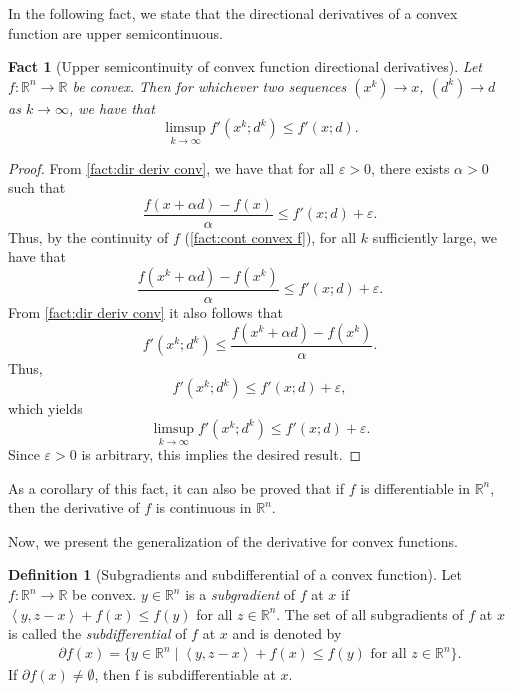 \documentclass[smallextended,numbook,nospthms]{svjour3}
\theoremstyle{plain}
\newtheorem{fact}[theorem]{Fact}
\theoremstyle{definition}
\newtheorem{definition}[theorem]{Definition}
\def\RR{\mathds R}
\newcommand{\scal}[2]{\left\langle{#1},{#2}  \right\rangle}
\begin{document}
In the following fact, we state that the directional derivatives of a convex function are upper semicontinuous.
\begin{fact}[Upper semicontinuity of convex function directional derivatives]\label{fact:dir deriv upper semicont}
Let $f: \RR^n \rightarrow \RR$ be convex. Then for whichever two sequences $(x^k) \rightarrow x$,	$(d^k) \rightarrow d$ as $k \rightarrow \infty$, we have that
\[
\limsup_{k \rightarrow \infty} f'(x^k;d^k) \leq f'(x;d).
\]
\end{fact}
\begin{proof}
	From \cref{fact:dir deriv conv}, we have that for all $\varepsilon>0$, there exists $\alpha>0$ such that
	\[
	\frac{f(x+\alpha d)-f(x)}{\alpha} \leq f'(x;d) + \varepsilon.
	\]
	Thus, by the continuity of $f$ (\cref{fact:cont convex f}), for all $k$ sufficiently large, we have that
	\[
	\frac{f(x^k+\alpha d)-f(x^k)}{\alpha} \leq f'(x;d) + \varepsilon.
	\]
	From \cref{fact:dir deriv conv} it also follows that
	\[
	f'(x^k;d^k)\leq\frac{f(x^k+\alpha d)-f(x^k)}{\alpha}.
	\]
	Thus,
	\[
	f'(x^k;d^k) \leq f'(x;d) + \varepsilon,
	\]
	which yields
	\[
	\limsup_{k \rightarrow \infty} f'(x^k;d^k) \leq f'(x;d) + \varepsilon.
	\]
	Since $\varepsilon>0$ is arbitrary, this implies the desired result.
\end{proof}
As a corollary of this fact, it can also be proved that if $f$ is differentiable in $\RR^n$, then the derivative of $f$ is continuous in $\RR^n$.

Now, we present the generalization of the derivative for convex functions.
\begin{definition}[Subgradients and subdifferential of a convex function]\label{def:subdif}
Let $f: \RR^n \rightarrow \RR$ be convex. $y \in \RR^n$ is a \emph{subgradient} of $f$ at $x$ if $\scal{y}{z-x} + f(x) \leq f(y)$ for all $z \in \RR^n$. The set of all subgradients of $f$ at $x$ is called the \emph{subdifferential} of $f$ at $x$ and is denoted by 
\begin{align}
	\partial f(x) = \{y \in \RR^n \mid \scal{y}{z-x} + f(x) \leq f(y) \text{ for all } z \in \RR^n \}.	
\end{align}
If $\partial f(x) \not = \emptyset$, then f is subdifferentiable at $x$.
\end{definition}
\end{document}

